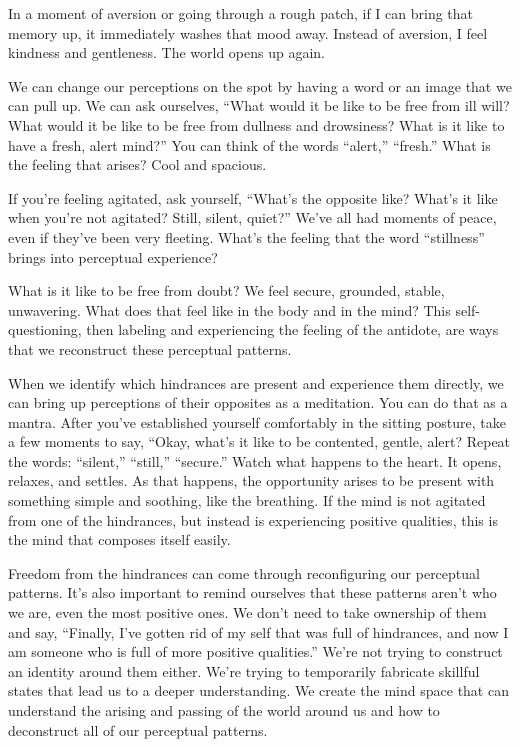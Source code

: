 In a moment of aversion or going through a rough patch, if I can bring that memory up, it immediately washes that mood away. Instead of aversion, I feel kindness and gentleness. The world opens up again.

We can change our perceptions on the spot by having a word or an image that we can pull up. We can ask ourselves, ``What would it be like to be free from ill will? What would it be like to be free from dullness and drowsiness? What is it like to have a fresh, alert mind?'' You can think of the words ``alert,'' ``fresh.'' What is the feeling that arises? Cool and spacious.{\parfillskip=0pt \par}

If you're feeling agitated, ask yourself, ``What's the opposite like? What's it like when you're not agitated? Still, silent, quiet?'' We've all had moments of peace, even if they've been very fleeting. What's the feeling that the word ``stillness'' brings into perceptual experience?

What is it like to be free from doubt? We feel secure, grounded, stable, unwavering. What does that feel like in the body and in the mind? This self-questioning, then labeling and experiencing the feeling of the antidote, are ways that we reconstruct these perceptual patterns.

When we identify which hindrances are present and experience them directly, we can bring up perceptions of their opposites as a meditation. You can do that as a mantra. After you've established yourself comfortably in the sitting posture, take a few moments to say, ``Okay, what's it like to be contented, gentle, alert? Repeat the words: ``silent,'' ``still,'' ``secure.'' Watch what happens to the heart. It opens, relaxes, and settles. As that happens, the opportunity arises to be present with something simple and soothing, like the breathing. If the mind is not agitated from one of the hindrances, but instead is experiencing positive qualities, this is the mind that composes itself easily.

Freedom from the hindrances can come through reconfiguring our perceptual patterns. It's also important to remind ourselves that these patterns aren't who we are, even the most positive ones. We don't need to take ownership of them and say, ``Finally, I've gotten rid of my self that was full of hindrances, and now I am someone who is full of more positive qualities.'' We're not trying to construct an identity around them either. We're trying to temporarily fabricate skillful states that lead us to a deeper understanding. We create the mind space that can understand the arising and passing of the world around us and how to deconstruct all of our perceptual patterns.

